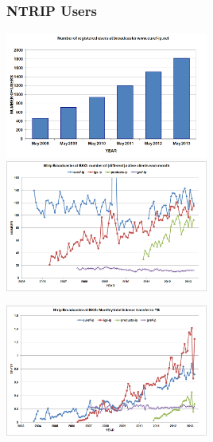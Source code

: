 \documentclass[10pt]{beamer}
\begin{document}

\begin{frame}
\frametitle{NTRIP Users}

\includegraphics[width=0.5\textwidth,angle=0]{numberRegisteredUsers_1.png}
\includegraphics[width=0.5\textwidth,angle=0]{activeClients_month_1.png}
\begin{center}
\includegraphics[width=0.5\textwidth,angle=0]{casterTransfer_1.png}
\end{center}

\end{frame}

\end{document}
